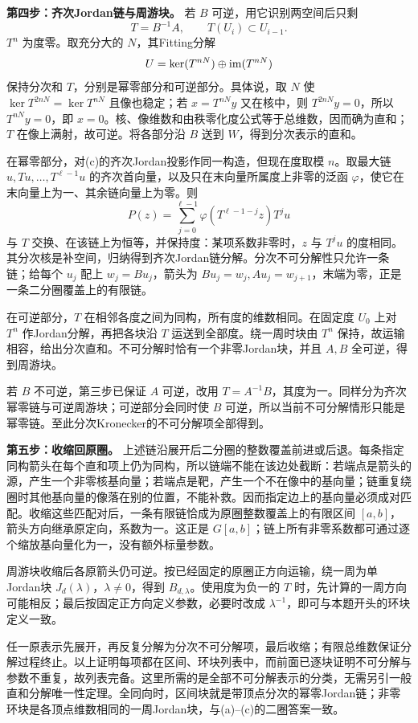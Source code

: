 \begin{solution}
\textbf{第四步：齐次Jordan链与周游块。}
若 $B$ 可逆，用它识别两空间后只剩
\[
 T=B^{-1}A,\qquad T(U_i)\subset U_{i-1}.
\]
$T^n$ 为度零。取充分大的 $N$，其Fitting分解
\[
 U=\ker(T^{nN})\oplus\operatorname{im}(T^{nN})
\]
保持分次和 $T$，分别是幂零部分和可逆部分。具体说，取 $N$ 使 $\ker T^{2nN}=\ker T^{nN}$ 且像也稳定；若 $x=T^{nN}y$ 又在核中，则 $T^{2nN}y=0$，所以 $T^{nN}y=0$，即 $x=0$。核、像维数和由秩零化度公式等于总维数，因而确为直和；$T$ 在像上满射，故可逆。将各部分沿 $B$ 送到 $W$，得到分次表示的直和。

在幂零部分，对(c)的齐次Jordan投影作同一构造，但现在度取模 $n$。取最大链 $u,Tu,\ldots,T^{\ell-1}u$ 的齐次首向量，以及只在末向量所属度上非零的泛函 $\varphi$，使它在末向量上为一、其余链向量上为零。则
\[
 P(z)=\sum_{j=0}^{\ell-1}\varphi(T^{\ell-1-j}z)T^ju
\]
与 $T$ 交换、在该链上为恒等，并保持度：某项系数非零时，$z$ 与 $T^ju$ 的度相同。其分次核是补空间，归纳得到齐次Jordan链分解。分次不可分解性只允许一条链；给每个 $u_j$ 配上 $w_j=Bu_j$，箭头为 $Bu_j=w_j,Au_j=w_{j+1}$，末端为零，正是一条二分圈覆盖上的有限链。

在可逆部分，$T$ 在相邻各度之间为同构，所有度的维数相同。在固定度 $U_0$ 上对 $T^n$ 作Jordan分解，再把各块沿 $T$ 运送到全部度。绕一周时块由 $T^n$ 保持，故运输相容，给出分次直和。不可分解时恰有一个非零Jordan块，并且 $A,B$ 全可逆，得到周游块。

若 $B$ 不可逆，第三步已保证 $A$ 可逆，改用 $T=A^{-1}B$，其度为一。同样分为齐次幂零链与可逆周游块；可逆部分会同时使 $B$ 可逆，所以当前不可分解情形只能是幂零链。至此分次Kronecker的不可分解项全部得到。

\textbf{第五步：收缩回原圈。}
上述链沿展开后二分圈的整数覆盖前进或后退。每条指定同构箭头在每个直和项上仍为同构，所以链端不能在该边处截断：若端点是箭头的源，产生一个非零核基向量；若端点是靶，产生一个不在像中的基向量；链重复绕圈时其他基向量的像落在别的位置，不能补救。因而指定边上的基向量必须成对匹配。收缩这些匹配对后，一条有限链恰成为原圈整数覆盖上的有限区间 $[a,b]$，箭头方向继承原定向，系数为一。这正是 $G[a,b]$；链上所有非零系数都可通过逐个缩放基向量化为一，没有额外标量参数。

周游块收缩后各原箭头仍可逆。按已经固定的原圈正方向运输，绕一周为单Jordan块 $J_d(\lambda)$，$\lambda\ne0$，得到 $B_{d,\lambda}$。使用度为负一的 $T$ 时，先计算的一周方向可能相反；最后按固定正方向定义参数，必要时改成 $\lambda^{-1}$，即可与本题开头的环块定义一致。

任一原表示先展开，再反复分解为分次不可分解项，最后收缩；有限总维数保证分解过程终止。以上证明每项都在区间、环块列表中，而前面已逐块证明不可分解与参数不重复，故列表完备。这里所需的是全部不可分解表示的分类，无需另引一般直和分解唯一性定理。全同向时，区间块就是带顶点分次的幂零Jordan链；非零环块是各顶点维数相同的一周Jordan块，与(a)--(c)的二圈答案一致。
\end{solution}

